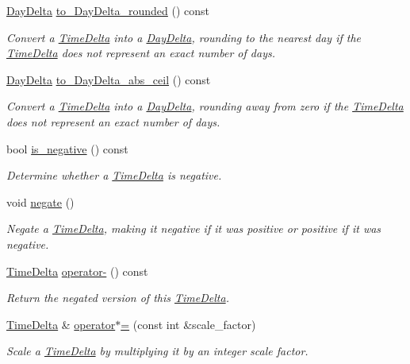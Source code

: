 \begin{DoxyCompactItemize}
\hyperlink{structDayDelta}{Day\-Delta} \hyperlink{structTimeDelta_ad4f0f7a7eb10b5c59e54faff404453e4}{to\-\_\-\-Day\-Delta\-\_\-rounded} () const 
\begin{DoxyCompactList}\small\item\em Convert a \hyperlink{structTimeDelta}{Time\-Delta} into a \hyperlink{structDayDelta}{Day\-Delta}, rounding to the nearest day if the \hyperlink{structTimeDelta}{Time\-Delta} does not represent an exact number of days. \end{DoxyCompactList}\item 
\hyperlink{structDayDelta}{Day\-Delta} \hyperlink{structTimeDelta_a7febe32ac5264cc90c672bd65e316187}{to\-\_\-\-Day\-Delta\-\_\-abs\-\_\-ceil} () const 
\begin{DoxyCompactList}\small\item\em Convert a \hyperlink{structTimeDelta}{Time\-Delta} into a \hyperlink{structDayDelta}{Day\-Delta}, rounding away from zero if the \hyperlink{structTimeDelta}{Time\-Delta} does not represent an exact number of days. \end{DoxyCompactList}\item 
bool \hyperlink{structTimeDelta_acc2faf0e9a1563c84fb68cad42521c54}{is\-\_\-negative} () const 
\begin{DoxyCompactList}\small\item\em Determine whether a \hyperlink{structTimeDelta}{Time\-Delta} is negative. \end{DoxyCompactList}\item 
void \hyperlink{structTimeDelta_a858c8d0eae6070a24ba7fd3e18a3cf3f}{negate} ()
\begin{DoxyCompactList}\small\item\em Negate a \hyperlink{structTimeDelta}{Time\-Delta}, making it negative if it was positive or positive if it was negative. \end{DoxyCompactList}\item 
\hyperlink{structTimeDelta}{Time\-Delta} \hyperlink{structTimeDelta_a660df6f5ba7291bef24d5a05639563b6}{operator-\/} () const 
\begin{DoxyCompactList}\small\item\em Return the negated version of this \hyperlink{structTimeDelta}{Time\-Delta}. \end{DoxyCompactList}\item 
\hyperlink{structTimeDelta}{Time\-Delta} \& \hyperlink{structTimeDelta_aa1417029a51a1e2e7cf20445ad6cfa01}{operator$\ast$=} (const int \&scale\-\_\-factor)
\begin{DoxyCompactList}\small\item\em Scale a \hyperlink{structTimeDelta}{Time\-Delta} by multiplying it by an integer scale factor. \end{DoxyCompactList}\item 

\end{DoxyCompactItemize}
